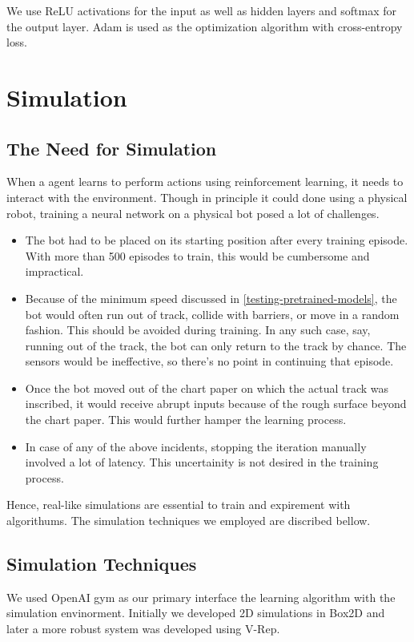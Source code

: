 \documentclass[12pt]{extreport}
\begin{document}
We use ReLU activations for the input as well as hidden layers and softmax for the output layer. Adam is used as the optimization algorithm with cross-entropy loss.

\chapter{Simulation} \label{simulation}

\section{The Need for Simulation} \label{need-for-simulation}
When a agent learns to perform actions using reinforcement learning, it
needs to interact with the environment. Though in principle it could
done using a physical robot, training a neural network on a physical bot posed
a lot of challenges.

\begin{itemize}
 \item The bot had to be placed on its starting position after every training episode. With more than 500 episodes to train, this would be cumbersome and impractical.
 \item Because of the minimum speed discussed in \autoref{testing-pretrained-models}, the bot would often run out of track, collide with barriers, or move in a random fashion. This should be avoided during training. In any such case, say, running out of the track, the bot can only return to the track by chance. The sensors would be ineffective, so there's no point in continuing that episode.
 \item Once the bot moved out of the chart paper on which the actual track was inscribed, it would receive abrupt inputs because of the rough surface beyond the chart paper. This would further hamper the learning process.
 \item In case of any of the above incidents, stopping the iteration manually involved a lot of latency. This uncertainity is not desired in the training process.
\end{itemize}

Hence, real-like simulations are essential to train and expirement with
algorithums. The simulation techniques we employed are discribed bellow.

\section{Simulation Techniques}
We used OpenAI gym as our primary interface the learning algorithm with the simulation envinorment. Initially we developed 2D simulations in Box2D and later a more robust system was developed using V-Rep.
\end{document}
